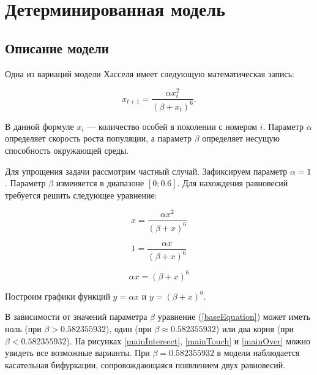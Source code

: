 \section{Детерминированная модель}

    \subsection{Описание модели}

        Одна из вариаций модели Хасселя \cite{densityDependenceInSingleSpeciesPopulations} имеет следующую математическая запись:

        \begin{equation}
            \label{origin}
            x_{t+1} = \frac{\alpha x_t^2}{(\beta + x_t)^6}.
        \end{equation}

        В данной формуле \(x_i\) --- количество особей в поколении с номером \(i\). Параметр \(\alpha\) определяет скорость роста популяции, а параметр \(\beta\) определяет несущую способность окружающей среды.
    
        Для упрощения задачи рассмотрим частный случай. Зафиксируем параметр \(\alpha = 1\). Параметр \(\beta\) изменяется в диапазоне \([0; 0.6]\). 
        Для нахождения равновесий требуется решить следующее уравнение:  

        \[x = \frac{\alpha x^2}{(\beta + x)^6}\]
    
        \[1 = \frac{\alpha x}{(\beta + x)^6}\]

        \begin{equation}
            \label{baseEquation}
            \alpha x = (\beta + x)^6
        \end{equation}

        Построим графики функций \(y = \alpha x\) и \(y = (\beta + x)^6\). 
        
        В зависимости от значений параметра \(\beta\) уравнение (\ref{baseEquation}) может иметь ноль (при \(\beta > 0.582355932\)), один (при \(\beta \approx 0.582355932\)) или два корня (при \(\beta < 0.582355932\)). На рисунках \ref{mainIntersect}, \ref{mainTouch} и \ref{mainOver} можно увидеть все возможные варианты. При \(\beta=0.582355932\) в модели наблюдается касательная бифуркации, сопровождающаяся появлением двух равновесий.

